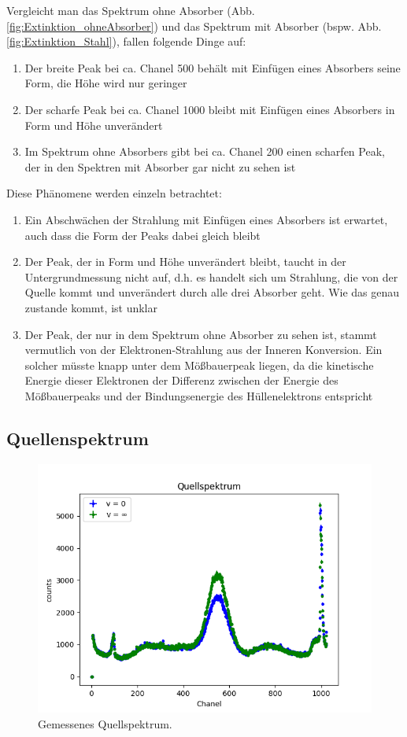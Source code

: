 \documentclass[12pt,a4paper]{article}
\begin{document}
Vergleicht man das Spektrum ohne Absorber (Abb. \ref{fig:Extinktion_ohneAbsorber}) und das Spektrum mit Absorber (bspw. Abb. \ref{fig:Extinktion_Stahl}), fallen folgende Dinge auf:
\begin{enumerate}
\item Der breite Peak bei ca. Chanel 500 behält mit Einfügen eines Absorbers seine Form, die Höhe wird nur geringer
\item Der scharfe Peak bei ca. Chanel 1000 bleibt mit Einfügen eines Absorbers in Form und Höhe unverändert
\item Im Spektrum ohne Absorbers gibt bei ca. Chanel 200 einen scharfen Peak, der in den Spektren mit Absorber gar nicht zu sehen ist
\end{enumerate}
Diese Phänomene werden einzeln betrachtet:
\begin{enumerate}
\item Ein Abschwächen der Strahlung mit Einfügen eines Absorbers ist erwartet, auch dass die Form der Peaks dabei gleich bleibt
\item Der Peak, der in Form und Höhe unverändert bleibt, taucht in der Untergrundmessung nicht auf, d.h. es handelt sich um Strahlung, die von der Quelle kommt und unverändert durch alle drei Absorber geht. Wie das genau zustande kommt, ist unklar
\item Der Peak, der nur in dem Spektrum ohne Absorber zu sehen ist, stammt vermutlich von der Elektronen-Strahlung aus der Inneren Konversion. Ein solcher müsste knapp unter dem Mößbauerpeak liegen, da die kinetische Energie dieser Elektronen der Differenz zwischen der Energie des Mößbauerpeaks und der Bindungsenergie des Hüllenelektrons entspricht
\end{enumerate}

\subsection{Quellenspektrum}
\begin{figure}
\centering
\includegraphics[scale=0.8]{Bilder/Quellspektrum/v0_und_vinf.png}
\caption{Gemessenes Quellspektrum.}
\label{fig:Quellspektrum}
\end{figure}
\end{document}

